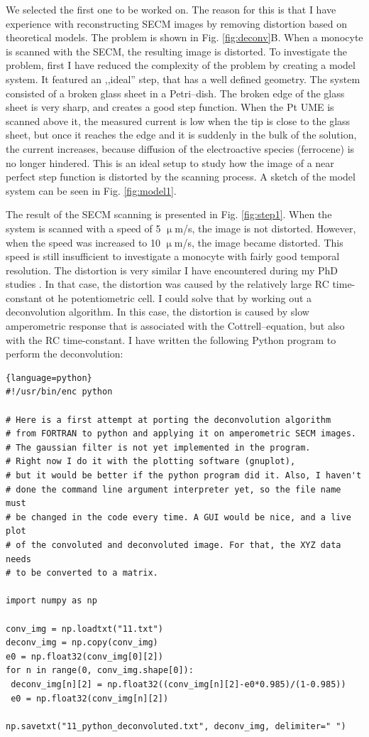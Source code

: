 \documentclass[a4paper, 11pt, oneside, bibliography=totoc]{article}
\begin{document}
We selected the first one to be worked on. The reason for this is that I have experience with reconstructing SECM images by removing distortion based on theoretical models. The problem is shown in Fig. \ref{fig:deconv}B. When a monocyte is scanned with the SECM, the resulting image is distorted. To investigate the problem, first I have reduced the complexity of the problem by creating a model system. It featured an ,,ideal'' step, that has a well defined geometry. The system consisted of a broken glass sheet in a Petri--dish. The broken edge of the glass sheet is very sharp, and creates a good step function. When the Pt UME is scanned above it, the measured current is low when the tip is close to the glass sheet, but once it reaches the edge and it is suddenly in the bulk of the solution, the current increases, because diffusion of the electroactive species (ferrocene) is no longer hindered. This is an ideal setup to study how the image of a near perfect step function is distorted by the scanning process. A sketch of the model system can be seen in Fig. \ref{fig:model1}.


The result of the SECM scanning is presented in Fig. \ref{fig:step1}. When the system is scanned with a speed of 5 $\upmu$m/s, the image is not distorted. However, when the speed was increased to 10 $\upmu$m/s, the image became distorted. This speed is still insufficient to investigate a monocyte with fairly good temporal resolution. The distortion is very similar I have encountered during my PhD studies \cite{kiss2015deconvolution, kiss2015deconvolution2}. In that case, the distortion was caused by the relatively large RC time-constant ot he potentiometric cell. I could solve that by working out a deconvolution algorithm. In this case, the distortion is caused by slow amperometric response that is associated with the Cottrell--equation, but also with the RC time-constant. I have written the following Python program to perform the deconvolution:

\begin{lstlisting}{language=python}
#!/usr/bin/enc python

# Here is a first attempt at porting the deconvolution algorithm
# from FORTRAN to python and applying it on amperometric SECM images.
# The gaussian filter is not yet implemented in the program.
# Right now I do it with the plotting software (gnuplot),
# but it would be better if the python program did it. Also, I haven't
# done the command line argument interpreter yet, so the file name must
# be changed in the code every time. A GUI would be nice, and a live plot
# of the convoluted and deconvoluted image. For that, the XYZ data needs
# to be converted to a matrix.

import numpy as np

conv_img = np.loadtxt("11.txt")
deconv_img = np.copy(conv_img)
e0 = np.float32(conv_img[0][2])
for n in range(0, conv_img.shape[0]):
 deconv_img[n][2] = np.float32((conv_img[n][2]-e0*0.985)/(1-0.985))
 e0 = np.float32(conv_img[n][2])

np.savetxt("11_python_deconvoluted.txt", deconv_img, delimiter=" ")
\end{lstlisting}
\end{document}
